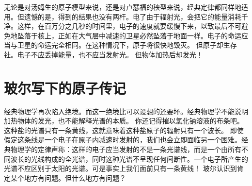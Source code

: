 无论是对汤姆生的原子模型来说，还是对卢瑟福的秧型来说，经典定律都同样地适用。但遗憾的是，得到的结果也没有两杆。电了由于辐射光，会把它的能量消耗千净。这样，在百万分之几秒的时间里，电子的速度就要缓慢下来，以致最后不可避免地坠落于核上，正如在大气层中减速的卫星必然坠落于地面一样。电子的命运应当与卫星的命运完全相同。在这种情况下，原子将很快地毁灭。
但原子却生存社。电子不应丢掉能量，也不应当发射光。
但物体加热后却发光！

\section{玻尔写下的原子传记}

经典物理学再次陷入绝境。而这一绝境比可以设想的还要坏。经典物理学不能说明加热物体的发光，也不能解释光谱的本质。
你还记得摧以氯化钠溶液的布条吧。这种盐的光谱只有一条黄线，这就意味着这种盐原子的辐射只有一个波长。
即使假定这条线是一个电子在原子内减速时发射的，我们也会立即面临另一个困难。经典物理学的定律声称：这样的电子应当发射的不是一条光谱线，而是一个由所有不同波长的光线构成的全光谱，同时这种光谱不呈现任何间断性。一个电子所产生的光谱不应区别于太阳的光谱。可是事实上我们面前只有一条黄线！
玻尔认识到肯定某个地方有问题。但什么地方有问题？

